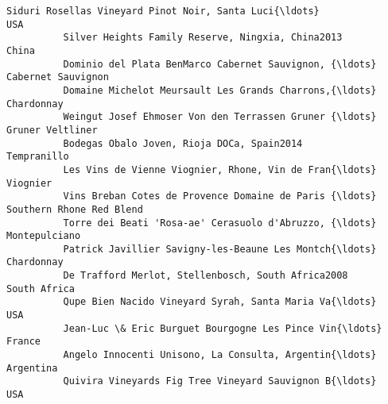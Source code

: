 \documentclass[11pt]{article}
\begin{document}
\begin{Verbatim}[commandchars=\\\{\}]
          Siduri Rosellas Vineyard Pinot Noir, Santa Luci{\ldots}                       USA   
          Silver Heights Family Reserve, Ningxia, China2013                      China   
          Dominio del Plata BenMarco Cabernet Sauvignon, {\ldots}        Cabernet Sauvignon   
          Domaine Michelot Meursault Les Grands Charrons,{\ldots}                Chardonnay   
          Weingut Josef Ehmoser Von den Terrassen Gruner {\ldots}          Gruner Veltliner   
          Bodegas Obalo Joven, Rioja DOCa, Spain2014                       Tempranillo   
          Les Vins de Vienne Viognier, Rhone, Vin de Fran{\ldots}                  Viognier   
          Vins Breban Cotes de Provence Domaine de Paris {\ldots}  Southern Rhone Red Blend   
          Torre dei Beati 'Rosa-ae' Cerasuolo d'Abruzzo, {\ldots}             Montepulciano   
          Patrick Javillier Savigny-les-Beaune Les Montch{\ldots}                Chardonnay   
          De Trafford Merlot, Stellenbosch, South Africa2008              South Africa   
          Qupe Bien Nacido Vineyard Syrah, Santa Maria Va{\ldots}                       USA   
          Jean-Luc \& Eric Burguet Bourgogne Les Pince Vin{\ldots}                    France   
          Angelo Innocenti Unisono, La Consulta, Argentin{\ldots}                 Argentina   
          Quivira Vineyards Fig Tree Vineyard Sauvignon B{\ldots}                       USA   
          

\end{Verbatim}
\end{document}
